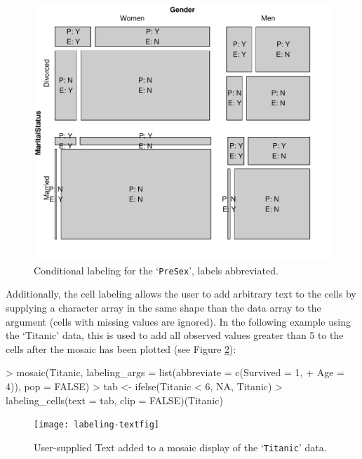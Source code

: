\documentclass[a4paper]{article}
\newcommand{\data}[1]{`\texttt{#1}'}
\begin{document}
\begin{figure}[h]
\begin{center}
\includegraphics{labeling-conditionalfig}
\caption{Conditional labeling for the \data{PreSex}, labels abbreviated.}
\label{fig:conditional}
\end{center}
\end{figure}

\noindent Additionally, the cell labeling allows the user to add
arbitrary text to the cells by supplying a character array in the same
shape than the data array to the  argument (cells with missing values
are ignored). In the following example using the `Titanic' data, 
this is used to add all observed values greater
than 5 to the cells after the mosaic has been plotted (see Figure \ref{fig:text}):

\begin{Schunk}
\begin{Sinput}
> mosaic(Titanic, labeling_args = list(abbreviate = c(Survived = 1, 
+     Age = 4)), pop = FALSE)
> tab <- ifelse(Titanic < 6, NA, Titanic)
> labeling_cells(text = tab, clip = FALSE)(Titanic)
\end{Sinput}
\end{Schunk}

\begin{figure}[h]
\begin{center}
\texttt{[image: labeling-textfig]}
\caption{User-supplied Text added to a mosaic display of the \data{Titanic} data.}
\label{fig:text}
\end{center}
\end{figure}
\end{document}
